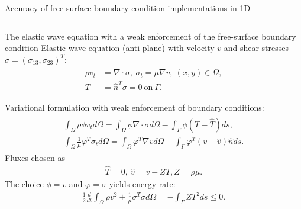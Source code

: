 \documentclass[final]{beamer}
\newlength{\onecolwid}
\newlength{\twocolwid}
\begin{document}
\begin{frame}[t]
\begin{columns}[t]
\begin{column}{\twocolwid}
\begin{alertblock}{Accuracy of free-surface boundary condition implementations in 1D}
\end{alertblock} 


\begin{columns}[t,totalwidth=\twocolwid] %

\begin{column}{\onecolwid} %


 \begin{block}{The elastic wave equation with a weak enforcement of the free-surface boundary condition}
  Elastic wave equation (anti-plane) with velocity $v$ and shear stresses
    $\sigma = (\sigma_{13},\sigma_{23})^T$:
  \begin{align}
    \begin{aligned}
    \rho v_t &= \nabla \cdot \sigma, 
    \nonumber
    \
    \sigma_t = \mu\nabla v, \ (x,y) \in \Omega,
    \nonumber
    \\
    T &= \hat{n}^T\sigma = 0 \ \mbox{on}\ \Gamma.
    \end{aligned}
    \nonumber
  \end{align}

  Variational formulation with weak enforcement of boundary conditions:
  \begin{align}
    \begin{aligned}
    \int_{\Omega} \rho \phi v_t d\Omega = \int_{\Omega} \phi \nabla \cdot \sigma d\Omega - \int_{\Gamma}\phi
    (T-\hat{T})ds,
    \nonumber
    \\
    \int_{\Omega} \frac{1}{\mu}\varphi^T \sigma_t d\Omega = \int_{\Omega} \varphi^T \nabla v d\Omega - \int_{\Gamma}\varphi^T
    (v-\hat{v})\hat{n}ds.
    \end{aligned}
    \label{elastic_var}
  \end{align}
  Fluxes chosen as
  \begin{align}
    \hat{T} = 0, \ \hat{v} = v - ZT, Z = \rho \mu.
  \end{align}
  The choice $\phi = v$ and $\varphi = \sigma$ yields energy rate:
  \begin{align}
    \frac{1}{2}\frac{d}{dt}\int_{\Omega} \rho v^2 + \frac{1}{\mu}\sigma^T\sigma d\Omega = -\int_{\Gamma} ZT^2ds \leq 0. 
  \end{align}


\end{block}  



\end{column}
\end{columns}
\end{column}
\end{columns}
\end{frame}
\end{document}
